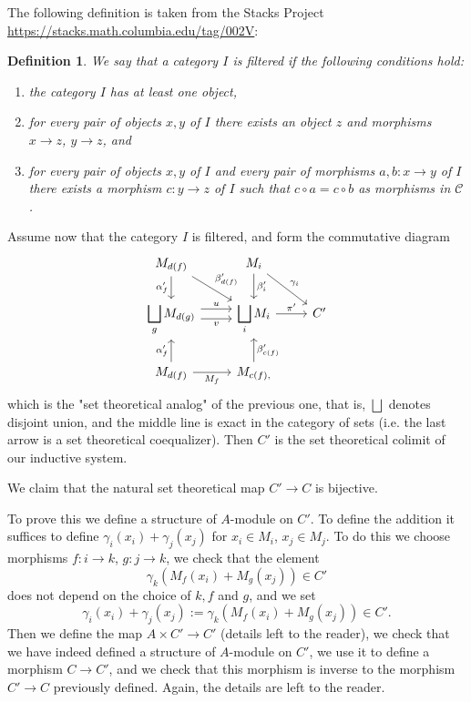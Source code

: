 \documentclass[parskip=half,fontsize=12pt]{scrartcl}%
\newcommand{\ds}{\displaystyle}
\newtheorem{df}[thm]{Definition}
\begin{document}
The following definition is taken from the Stacks Project\\ \href{https://stacks.math.columbia.edu/tag/002V}{https://stacks.math.columbia.edu/tag/002V}:

\begin{df}
We say that a category $I$ is \emph{filtered} if the following conditions hold:
\begin{enumerate}
\item the category $I$ has at least one object,
\item for every pair of objects $x, y$ of $I$ there exists an object $z$ and morphisms $x \to z$, $y \to z$, and
\item for every pair of objects $x, y$ of $I$ and every pair of morphisms $a, b : x \to y$ of $I$ there exists a morphism $c : y \to z$ of $I$ such that $c \circ a=c\circ b$ as morphisms in $\mathcal{C}$.
\end{enumerate}
\end{df}

Assume now that the category $I$ is filtered, and form the commutative diagram %
$$
\begin{tikzcd}
M_{d(f)}\ar[d,"\alpha'_{f}"']\ar[dr,"\beta'_{d(f)}"]&M_i\ar[d,"\beta'_i"]\ar[dr,"\gamma_i"]\\ 
\ds\bigsqcup_gM_{d(g)}\ar[r,yshift=0.9ex,"u"]\ar[r,yshift=-0.9ex,"v"']&\ds\bigsqcup_iM_i\ar[r,"\pi'"]&C'\\ 
M_{d(f)}\ar[u,"\alpha'_{f}"]\ar[r,"M_f"']&M_{c(f),}\ar[u,"\beta'_{c(f)}"']
\end{tikzcd}
$$ 
which is the "set theoretical analog" of the previous one, that is, $\bigsqcup$ denotes disjoint union, and the middle line is exact in the category of sets (i.e. the last arrow is a set theoretical coequalizer). Then $C'$ is the set theoretical colimit of our inductive system. 

We claim that the natural set theoretical map $C'\to C$ is bijective. 

To prove this we define a structure of $A$-module on $C'$. To define the addition it suffices to define $\gamma_i(x_i)+\gamma_j(x_j)$ for $x_i\in M_i$, $x_j\in M_j$. To do this we choose morphisms $f:i\to k$, $g:j\to k$, we check that the element 
$$
\gamma_k(M_f(x_i)+M_g(x_j))\in C'
$$ 
does not depend on the choice of $k,f$ and $g$, and we set 
$$
\gamma_i(x_i)+\gamma_j(x_j):=\gamma_k(M_f(x_i)+M_g(x_j))\in C'.
$$ 
Then we define the map $A\times C'\to C'$ (details left to the reader), we check that we have indeed defined a structure of $A$-module on $C'$, we use it to define a morphism $C\to C'$, and we check that this morphism is inverse to the morphism $C'\to C$ previously defined. Again, the details are left to the reader. 
\end{document}
